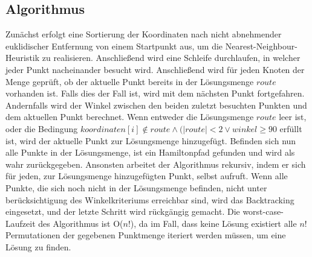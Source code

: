 \documentclass[a4paper,10pt,ngerman]{scrartcl}
\begin{document}
    \subsection{Algorithmus}\label{subsec:algorithmus}

    Zunächst erfolgt eine Sortierung der Koordinaten nach nicht abnehmender euklidischer Entfernung von einem Startpunkt aus,
    um die Nearest-Neighbour-Heuristik zu realisieren.
    Anschließend wird eine Schleife durchlaufen, in welcher jeder Punkt nacheinander besucht wird.
    Anschließend wird für jeden Knoten der Menge geprüft, ob der aktuelle Punkt bereits in der Lösungsmenge $route$ vorhanden ist.
    Falls dies der Fall ist, wird mit dem nächsten Punkt fortgefahren.
    Andernfalls wird der Winkel zwischen den beiden zuletzt besuchten Punkten und dem aktuellen Punkt berechnet.
    Wenn entweder die Lösungsmenge $route$ leer ist, oder die Bedingung $\textit{koordinaten}[i] \notin \textit{route} \land (|\textit{route}|<2 \lor \textit{winkel} \geq 90$ erfüllt ist,
    wird der aktuelle Punkt zur Lösungsmenge hinzugefügt.
    Befinden sich nun alle Punkte in der Lösungsmenge, ist ein Hamiltonpfad gefunden und wird als wahr zurückgegeben.
    Ansonsten arbeitet der Algorithmus rekursiv, indem er sich für jeden, zur Lösungsmenge hinzugefügten Punkt, selbst aufruft.
    Wenn alle Punkte, die sich noch nicht in der Lösungsmenge befinden, nicht unter berücksichtigung des Winkelkriteriums erreichbar sind,
    wird das Backtracking eingesetzt, und der letzte Schritt wird rückgängig gemacht.
    Die worst-case-Laufzeit des Algorithmus ist O($n!$), da im Fall,
    dass keine Lösung existiert alle $n!$ Permutationen der gegebenen Punktmenge iteriert werden müssen, um eine Lösung zu finden.
\end{document}
